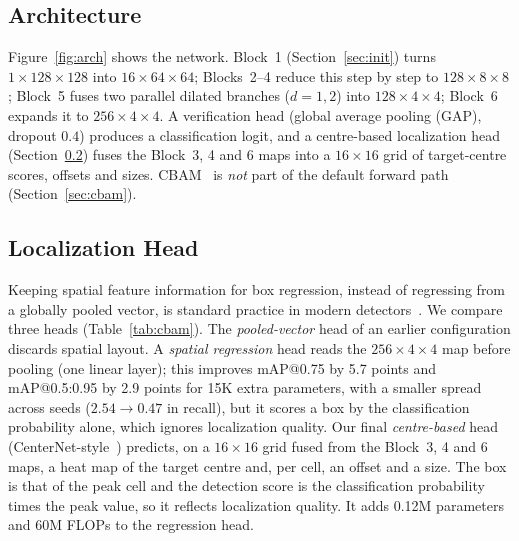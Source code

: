 \documentclass[pdflatex,sn-mathphys-num,iicol]{sn-jnl}%
\begin{document}
\subsection{Architecture}\label{sec:arch}
Figure~\ref{fig:arch} shows the network. Block~1 (Section~\ref{sec:init})
turns $1\times128\times128$ into $16\times64\times64$; Blocks~2--4 reduce
this step by step to $128\times8\times8$; Block~5 fuses two parallel
dilated branches ($d{=}1,2$) into $128\times4\times4$; Block~6 expands it
to $256\times4\times4$. A verification head (global average pooling (GAP),
dropout $0.4$) produces a classification logit, and a centre-based
localization head (Section~\ref{sec:spatialbbox}) fuses the Block~3, 4 and 6
maps into a $16{\times}16$ grid of target-centre scores, offsets and sizes. CBAM~\cite{woo2018cbam} is \emph{not} part of the default forward
path (Section~\ref{sec:cbam}).

\subsection{Localization Head}\label{sec:spatialbbox}
Keeping spatial feature information for box regression, instead of regressing
from a globally pooled vector, is standard practice in modern
detectors~\cite{ren2015faster,liu2016ssd}. We compare three heads
(Table~\ref{tab:cbam}). The \emph{pooled-vector} head of an earlier
configuration discards spatial layout. A \emph{spatial regression} head reads
the $256\times4\times4$ map before pooling (one linear layer); this improves
mAP@0.75 by 5.7 points and mAP@0.5:0.95 by 2.9 points for 15K extra parameters,
with a smaller spread across seeds ($2.54\to0.47$ in recall), but it scores a box
by the classification probability alone, which ignores localization quality. Our
final \emph{centre-based} head (CenterNet-style~\cite{zhou2019objects}) predicts,
on a $16{\times}16$ grid fused from the Block~3, 4 and 6 maps, a heat map of the
target centre and, per cell, an offset and a size. The box is that of the peak cell
and the detection score is the classification probability times the peak value,
so it reflects localization quality. It adds 0.12M parameters and 60M FLOPs to the
regression head.
\end{document}
